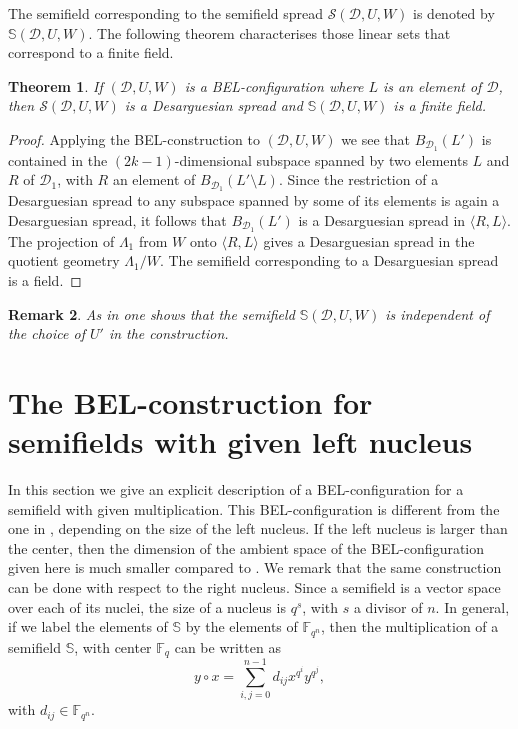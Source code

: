 \documentclass[12pt]{amsart}
\newtheorem{theorem}{\sc Theorem}[section]
\newtheorem{remark}[theorem]{\sc Remark}
\def\F{\mathbb{F}}
\def\S{\mathbb{S}}
\def\D{\mathcal{D}}
\begin{document}
The semifield corresponding to the semifield spread ${\mathcal{S}}(\D,U,W)$ is denoted by $\S(\D,U,W)$.
The following theorem characterises those linear sets that correspond to a finite field.
\begin{theorem}\label{thm:field}
If $(\D,U,W)$ is a BEL-configuration where $L$ is an element of $\D$, then ${\mathcal{S}}(\D,U,W)$ is a Desarguesian spread and $\S(\D,U,W)$ is a finite field.
\end{theorem}
\begin{proof}
Applying the BEL-construction to $(\D,U,W)$ we see that $B_{\D_1}(L')$ is contained in the $(2k-1)$-dimensional subspace spanned by two elements $L$ and $R$ of $\D_1$, with $R$ an element of $B_{\D_1}(L'\setminus L)$. Since the restriction of a Desarguesian spread to any subspace spanned by some of its elements is again a Desarguesian spread, it follows that $B_{\D_1}(L')$ is a Desarguesian spread in $\langle R, L \rangle$. The projection of $\Lambda_1$ from $W$ onto $\langle R, L \rangle$ gives a Desarguesian spread in the quotient geometry $\Lambda_1/W$. The semifield corresponding to a Desarguesian spread is a field.
\end{proof}

\begin{remark}
As in \cite[Remark 2.3]{BEL} one shows that the semifield $\S(\D,U,W)$ is independent of the choice of $U'$ in the construction.
\end{remark}

\section{The BEL-construction for semifields with given left nucleus}
In this section we give an explicit description of a BEL-configuration for a semifield with given multiplication. This BEL-configuration is different from the one in \cite{BEL}, depending on the
size of the left nucleus. If the left nucleus is larger than the center, then the dimension of the ambient space of the BEL-configuration given here is much smaller compared to \cite{BEL}. We remark that the same construction can be done with respect to the right nucleus.
Since a semifield is a vector space over each of its nuclei,
the size of a nucleus is $q^s$, with $s$ a divisor of $n$. 
In general, if we label the elements of $\S$ by the elements of $\F_{q^n}$, then the multiplication of a
semifield $\S$, with center $\F_q$ can be written as
$$
y\circ x = \sum_{i,j = 0}^{n-1}d_{ij}x^{q^i}y^{q^j},
$$
with $d_{ij} \in \F_{q^n}$. 
\end{document}
